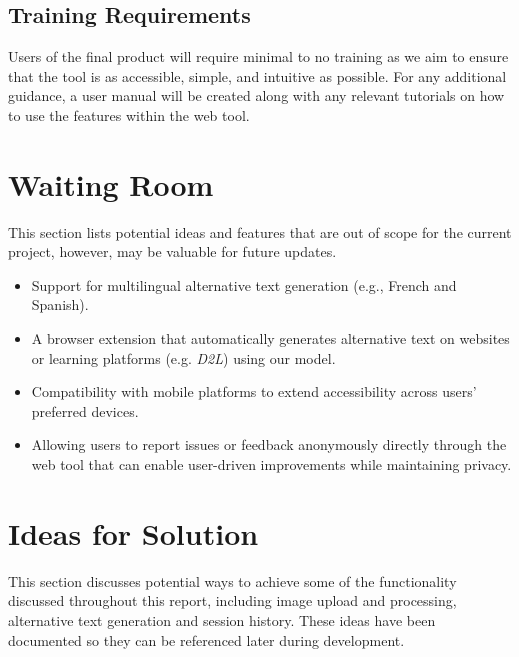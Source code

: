\documentclass[12pt]{article}
\begin{document}
\subsection{Training Requirements}
Users of the final product will require minimal to no training as we
aim to ensure that the tool is as accessible, simple, and intuitive
as possible. For any additional guidance,
a user manual will be created along with any relevant tutorials on
how to use the features within the web tool.

\section{Waiting Room}
This section lists potential ideas and features that are out of scope
for the current project, however, may be valuable for future updates.
\begin{itemize}
  \item Support for multilingual alternative text generation (e.g.,
    French and Spanish).
  \item A browser extension that automatically generates alternative
    text on websites or learning platforms (e.g. \textit{D2L}) using our model.
  \item Compatibility with mobile platforms to extend accessibility
    across users' preferred devices.
  \item Allowing users to report issues or feedback anonymously directly through the web tool 
  that can enable user-driven improvements while maintaining privacy.

\end{itemize}

\section{Ideas for Solution}
This section discusses potential ways to achieve some of the functionality discussed throughout this report, 
including image upload and processing, alternative text generation and session history. 
These ideas have been documented so they can be referenced later during development.\\
\end{document}
